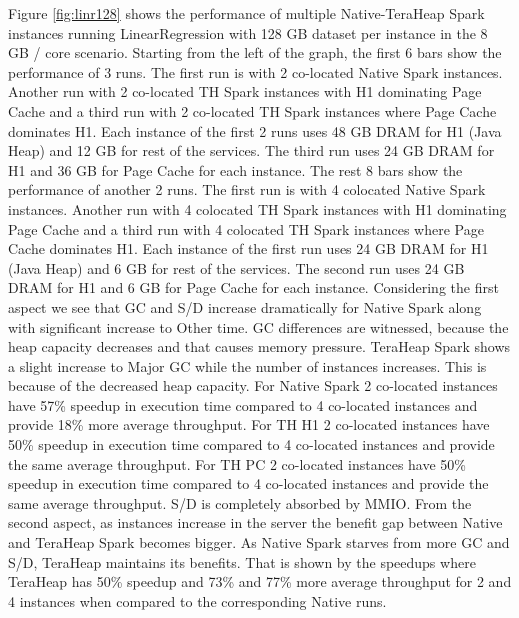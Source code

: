 Figure \ref{fig:linr128} shows the performance of multiple
Native-TeraHeap Spark instances running LinearRegression with 128 GB
dataset per instance in the 8 GB / core scenario.
Starting from the left of the graph, the first 6 bars show the
performance of 3 runs. The first run is with 2 co-located Native Spark instances.
Another run with 2 co-located TH Spark instances with H1 dominating Page Cache
and a third run with 2 co-located TH Spark instances where Page Cache dominates H1.
Each instance of the first 2 runs uses 48 GB DRAM for H1 (Java Heap) and 12 GB for rest of the services.
The third run uses 24 GB DRAM for H1 and 36 GB for Page Cache for each instance.
The rest 8 bars show the performance of another 2 runs. The first run is with 4 colocated Native Spark instances.
Another run with 4 colocated TH Spark instances with H1 dominating Page Cache
and a third run with 4 colocated TH Spark instances where Page Cache dominates H1.
Each instance of the first run uses 24 GB DRAM for H1 (Java Heap) and 6 GB for rest of the services.
The second run uses 24 GB DRAM for H1 and 6 GB for Page Cache for each instance.
Considering the first aspect we see that GC and S/D increase dramatically for Native Spark along with significant increase to Other time. GC differences are witnessed, because the heap capacity decreases and that causes memory pressure. TeraHeap Spark shows a slight increase to Major GC while the number of instances increases. This is because of the decreased heap capacity. For Native Spark 2 co-located instances have 57\% speedup in execution time compared to 4 co-located instances and provide 18\% more average throughput. For TH H1 2 co-located instances have 50\% speedup in execution time compared to 4 co-located instances and provide the same average throughput. For TH PC 2 co-located instances have 50\% speedup in execution time compared to 4 co-located instances and provide the same average throughput. 
S/D is completely absorbed by MMIO. From the second aspect, as instances increase in the server the benefit gap between Native and TeraHeap Spark becomes bigger. As Native Spark starves from more GC and S/D, TeraHeap maintains its benefits. That is shown by the speedups where TeraHeap has 50\% speedup and 73\% and 77\% more average throughput for 2 and 4 instances when compared to the corresponding Native runs.

